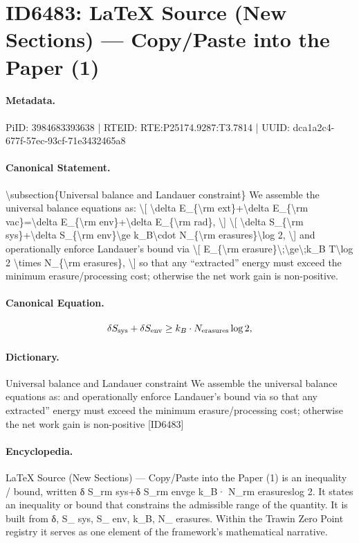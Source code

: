 \section*{ID6483: LaTeX Source (New Sections) — Copy/Paste into the Paper (1)}
\paragraph{Metadata.}
PiID: 3984683393638 | RTEID: RTE:P25174.9287:T3.7814 | UUID: dca1a2c4-677f-57ec-93cf-71e3432465a8

\paragraph{Canonical Statement.}
\textbackslash{}subsection\{Universal balance and Landauer constraint\} We assemble the universal balance equations as: \textbackslash{}[ \textbackslash{}delta E\_\{\textbackslash{}rm ext\}+\textbackslash{}delta E\_\{\textbackslash{}rm vac\}=\textbackslash{}delta E\_\{\textbackslash{}rm env\}+\textbackslash{}delta E\_\{\textbackslash{}rm rad\}, \textbackslash{}] \textbackslash{}[ \textbackslash{}delta S\_\{\textbackslash{}rm sys\}+\textbackslash{}delta S\_\{\textbackslash{}rm env\}\textbackslash{}ge k\_B\textbackslash{}cdot N\_\{\textbackslash{}rm erasures\}\textbackslash{}log 2, \textbackslash{}] and operationally enforce Landauer's bound via \textbackslash{}[ E\_\{\textbackslash{}rm erasure\}\textbackslash{};\textbackslash{}ge\textbackslash{};k\_B T\textbackslash{}log 2 \textbackslash{}times N\_\{\textbackslash{}rm erasures\}, \textbackslash{}] so that any ``extracted'' energy must exceed the minimum erasure/processing cost; otherwise the net work gain is non-positive.

\paragraph{Canonical Equation.}
\[
\delta S_{\rm sys}+\delta S_{\rm env}\ge k_B\cdot N_{\rm erasures}\log 2,
\]

\paragraph{Dictionary.}
Universal balance and Landauer constraint We assemble the universal balance equations as: and operationally enforce Landauer's bound via so that any extracted'' energy must exceed the minimum erasure/processing cost; otherwise the net work gain is non-positive [ID6483]

\paragraph{Encyclopedia.}
LaTeX Source (New Sections) — Copy/Paste into the Paper (1) is an inequality / bound, written δ S\_rm sys+δ S\_rm envge k\_B· N\_rm erasureslog 2. It states an inequality or bound that constrains the admissible range of the quantity. It is built from δ, S\_ sys, S\_ env, k\_B, N\_ erasures. Within the Trawin Zero Point registry it serves as one element of the framework's mathematical narrative.
